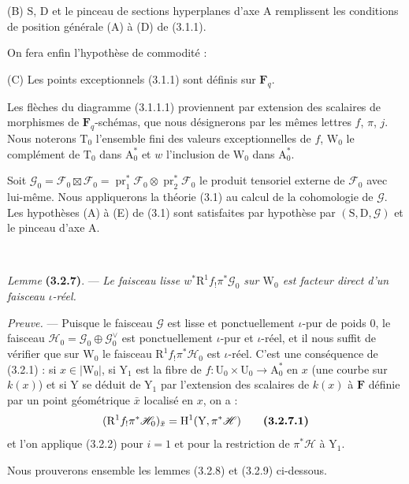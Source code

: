\documentclass[11pt,leqno]{article}
\newcommand{\Page}[1]{\ifvmode\noindent\else\unskip\ \fi{\footnotesize\textcolor{gray}{[p.\,#1]}}\ \ignorespaces}
\begin{document}
(B) \(\mathrm{S}\), \(\mathrm{D}\) et le pinceau de sections hyperplanes d’axe \(\mathrm{A}\) remplissent les conditions de position générale (A) à (D) de (3.1.1).

On fera enfin l’hypothèse de commodité :

(C) Les points exceptionnels (3.1.1) sont définis sur \(\mathbf{F}_q\).

Les flèches du diagramme (3.1.1.1) proviennent par extension des scalaires de morphismes de \(\mathbf{F}_q\)-schémas, que nous désignerons par les mêmes lettres \(f\), \(\pi\), \(j\). Nous noterons \(\mathrm{T}_0\) l’ensemble fini des valeurs exceptionnelles de \(f\), \(\mathrm{W}_0\) le complément de \(\mathrm{T}_0\) dans \(\mathrm{A}_0^*\) et \(w\) l’inclusion de \(\mathrm{W}_0\) dans \(\mathrm{A}_0^*\).

Soit \(\mathscr{G}_0=\mathscr{F}_0\boxtimes\mathscr{F}_0=\operatorname{pr}_1^*\mathscr{F}_0\otimes\operatorname{pr}_2^*\mathscr{F}_0\) le produit tensoriel externe de \(\mathscr{F}_0\) avec lui-même. Nous appliquerons la théorie (3.1) au calcul de la cohomologie de \(\mathscr{G}\). Les hypothèses (A) à (E) de (3.1) sont satisfaites par hypothèse par \((\mathrm{S},\mathrm{D},\mathscr{G})\) et le pinceau d’axe \(\mathrm{A}\).

\Page{202}

\textit{Lemme} \textbf{(3.2.7)}. — \textit{Le faisceau lisse \(w^*\mathrm{R}^1f_!\pi^*\mathscr{G}_0\) sur \(\mathrm{W}_0\) est facteur direct d’un faisceau \(\iota\)-réel.}

\textit{Preuve.} — Puisque le faisceau \(\mathscr{G}\) est lisse et ponctuellement \(\iota\)-pur de poids \(0\), le faisceau \(\mathscr{H}_0=\mathscr{G}_0\oplus\mathscr{G}_0^\vee\) est ponctuellement \(\iota\)-pur et \(\iota\)-réel, et il nous suffit de vérifier que sur \(\mathrm{W}_0\) le faisceau \(\mathrm{R}^1f_!\pi^*\mathscr{H}_0\) est \(\iota\)-réel. C’est une conséquence de (3.2.1) : si \(x\in|\mathrm{W}_0|\), si \(\mathrm{Y}_1\) est la fibre de \(f:\mathrm{U}_0\times\mathrm{U}_0\to\mathrm{A}_0^*\) en \(x\) (une courbe sur \(k(x)\)) et si \(\mathrm{Y}\) se déduit de \(\mathrm{Y}_1\) par l’extension des scalaires de \(k(x)\) à \(\mathbf{F}\) définie par un point géométrique \(\bar{x}\) localisé en \(x\), on a :
\[
(\mathrm{R}^1f_!\pi^*\mathscr{H}_0)_{\bar{x}}
=\mathrm{H}^1(\mathrm{Y},\pi^*\mathscr{H})
\tag*{\textbf{(3.2.7.1)}}
\]
et l’on applique (3.2.2) pour \(i=1\) et pour la restriction de \(\pi^*\mathscr{H}\) à \(\mathrm{Y}_1\).

Nous prouverons ensemble les lemmes (3.2.8) et (3.2.9) ci-dessous.
\end{document}
